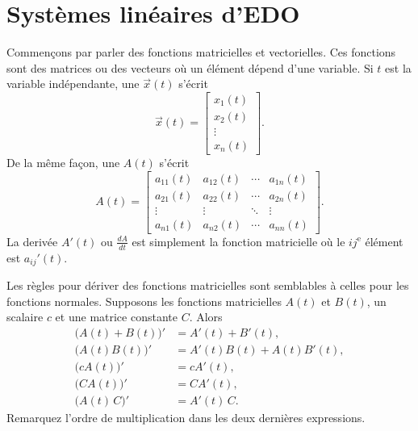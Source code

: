 
\sectionnewpage
\section{Systèmes linéaires d'EDO}
\label{linsystems:section}


Commençons par parler des fonctions matricielles et vectorielles. Ces fonctions sont des matrices ou des vecteurs où un élément dépend d'une variable. Si $t$ est la variable indépendante, une
\emph{}
$\vec{x}(t)$ s'écrit
\begin{equation*}
\vec{x}(t) = \begin{bmatrix}
x_1(t) \\
x_2(t) \\
\vdots \\
x_n(t)
\end{bmatrix} .
\end{equation*}
De la même façon, une \emph{} $A(t)$ s'écrit
\begin{equation*}
A(t) =
\begin{bmatrix}
a_{11}(t) & a_{12}(t) & \cdots & a_{1n}(t) \\
a_{21}(t) & a_{22}(t) & \cdots & a_{2n}(t) \\
\vdots & \vdots & \ddots & \vdots \\
a_{n1}(t) & a_{n2}(t) & \cdots & a_{nn}(t)
\end{bmatrix} .
\end{equation*}
La derivée $A'(t)$ ou $\frac{dA}{dt}$ est simplement la fonction matricielle où le $ij^{\text{e}}$ élément est $a_{ij}'(t)$.

Les règles pour dériver des fonctions matricielles sont semblables à celles pour les fonctions normales. Supposons les fonctions matricielles $A(t)$ et $B(t)$, un scalaire $c$ et une matrice constante $C$.
Alors
\begin{align*}
\bigl(A(t)+B(t)\bigr)' & = A'(t) + B'(t), \\
\bigl(A(t)B(t)\bigr)' & = A'(t)B(t) + A(t)B'(t), \\
\bigl(cA(t)\bigr)' & = cA'(t), \\
\bigl(CA(t)\bigr)' & = CA'(t), \\
\bigl(A(t)\,C\bigr)' & = A'(t)\,C .
\end{align*}
Remarquez l’ordre de multiplication dans les deux dernières expressions.

